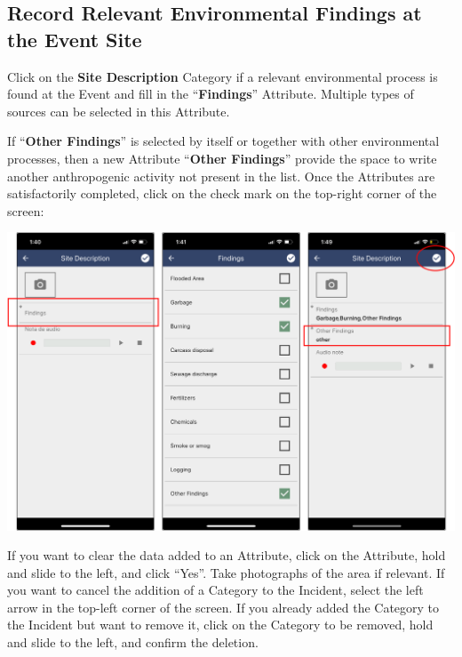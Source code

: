 \documentclass[
  letterpaper,
  DIV=11,
  numbers=noendperiod]{scrreprt}
\begin{document}
\hypertarget{record-relevant-environmental-findings-at-the-event-site}{%
\subsection*{Record Relevant Environmental Findings at the Event
Site}\label{record-relevant-environmental-findings-at-the-event-site}}

Click on the \textbf{Site Description} Category if a relevant
environmental process is found at the Event and fill in the
``\textbf{Findings}'' Attribute. Multiple types of sources can be
selected in this Attribute.

If ``\textbf{Other Findings}'' is selected by itself or together with
other environmental processes, then a new Attribute ``\textbf{Other
Findings}'' provide the space to write another anthropogenic activity
not present in the list. Once the Attributes are satisfactorily
completed, click on the check mark on the top-right corner of the
screen:

\includegraphics[width=8.75in,height=\textheight]{Pictures_for_manual/Picture7.png}

If you want to clear the data added to an Attribute, click on the
Attribute, hold and slide to the left, and click ``Yes''. Take
photographs of the area if relevant. If you want to cancel the addition
of a Category to the Incident, select the left arrow in the top-left
corner of the screen. If you already added the Category to the Incident
but want to remove it, click on the Category to be removed, hold and
slide to the left, and confirm the deletion.
\end{document}
